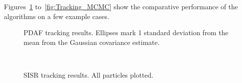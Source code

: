 Figures~\ref{fig:Tracking_PDAF} to~\ref{fig:Tracking_MCMC} show the comparative performance of the algorithms on a few example cases.

\begin{figure} \centering
{}
\caption{PDAF tracking results. Ellipses mark 1 standard deviation from the mean from the Gaussian covariance estimate.}%
\label{fig:Tracking_PDAF}%
\end{figure}

\begin{figure} \centering
{}
 \\
\caption{SISR tracking results. All particles plotted.}%
\label{fig:Tracking_SISR}%
\end{figure}

